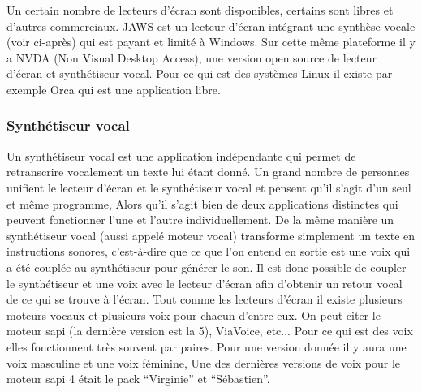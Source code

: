 \documentclass[french,a4paper]{report}
\begin{document}
Un certain nombre de lecteurs d'écran sont disponibles, certains sont libres et d'autres commerciaux. JAWS est un lecteur d'écran intégrant une synthèse vocale (voir ci-après) qui est payant et limité à Windows. Sur cette même plateforme il y a NVDA (Non Visual Desktop Access), une version open source de lecteur d'écran et synthétiseur vocal. Pour ce qui est des systèmes Linux il existe par exemple Orca qui est une application libre.
\subsubsection{Synthétiseur vocal}
Un synthétiseur vocal est une application indépendante qui permet de retranscrire vocalement un texte lui étant donné.
Un grand nombre de personnes unifient le lecteur d'écran et le synthétiseur vocal et pensent qu'il s'agit d'un seul et même programme, Alors qu'il s'agit bien de deux applications distinctes qui peuvent fonctionner l'une et l'autre individuellement.
\newline
De la même manière un synthétiseur vocal (aussi appelé moteur vocal) transforme simplement un
texte en instructions sonores, c'est-à-dire que ce que l'on entend en sortie est une voix qui
a été couplée au synthétiseur pour générer le son.
\newline
Il est donc possible de coupler le synthétiseur et une voix avec le lecteur d'écran afin d'obtenir un retour vocal de ce qui se trouve à l'écran.
\newline
Tout comme les lecteurs d'écran il existe plusieurs moteurs vocaux et plusieurs voix pour chacun d'entre eux. On peut citer le moteur sapi (la dernière version est la 5), ViaVoice, etc...
Pour ce qui est des voix elles fonctionnent très souvent par paires. Pour une version donnée il y aura une voix masculine et une voix féminine, Une des dernières versions de voix pour le moteur sapi 4 était le pack \enquote{Virginie} et \enquote{Sébastien}.
\end{document}
